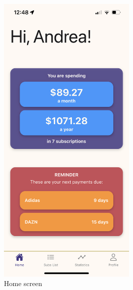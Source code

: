\documentclass[11pt]{article}
\begin{document}
\begin{figure}[h!]
    \centering
    \begin{minipage}[c]{0.45\textwidth}
        \centering
        \includegraphics[width=0.6\textwidth, clip]{../../assets/smartphone/home.PNG}
        \caption{Home screen}
        \label{fig:home}
    \end{minipage}\hspace{1cm}%
    \begin{minipage}[c]{0.45\textwidth}
        \centering

\end{minipage}
\end{figure}
\end{document}
